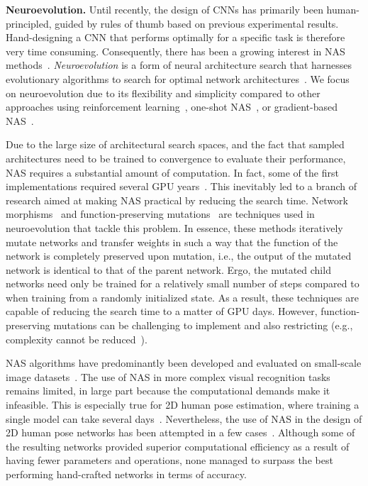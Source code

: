 \documentclass[final]{cvpr}
\begin{document}
\medskip\noindent\textbf{Neuroevolution.} Until recently, the design of CNNs has primarily been human-principled, guided by rules of thumb based on previous experimental results. Hand-designing a CNN that performs optimally for a specific task is therefore very time consuming. Consequently, there has been a growing interest in NAS methods~\cite{zoph2017neural}. \textit{Neuroevolution} is a form of neural architecture search that harnesses evolutionary algorithms to search for optimal network architectures~\cite{real2017large}. We focus on neuroevolution due to its flexibility and simplicity compared to other approaches using reinforcement learning~\cite{zoph2017neural, baker2016designing, zoph2018learning, tan2019mnasnet, tan2019efficientnet}, one-shot NAS~\cite{bender2018understanding, brock2017smash, pham2018efficient}, or gradient-based NAS~\cite{liu2018darts, yang2019pose}. 

Due to the large size of architectural search spaces, and the fact that sampled architectures need to be trained to convergence to evaluate their performance, NAS requires a substantial amount of computation. In fact, some of the first implementations required several GPU years~\cite{zoph2017neural, zoph2018learning, real2017large}. This inevitably led to a branch of research aimed at making NAS practical by reducing the search time. Network morphisms~\cite{wei2016network} and function-preserving mutations~\cite{wistuba2018deep} are techniques used in neuroevolution that tackle this problem. In essence, these methods iteratively mutate networks and transfer weights in such a way that the function of the network is completely preserved upon mutation, i.e., the output of the mutated network is identical to that of the parent network. Ergo, the mutated child networks need only be trained for a relatively small number of steps compared to when training from a randomly initialized state. As a result, these techniques are capable of reducing the search time to a matter of GPU days. However, function-preserving mutations can be challenging to implement and also restricting (e.g., complexity cannot be reduced~\cite{wistuba2018deep}).

NAS algorithms have predominantly been developed and evaluated on small-scale image datasets~\cite{wistuba2019survey}. The use of NAS in more complex visual recognition tasks remains limited, in large part because the computational demands make it infeasible. This is especially true for 2D human pose estimation, where training a single model can take several days~\cite{chen2018cascaded}. Nevertheless, the use of NAS in the design of 2D human pose networks has been attempted in a few cases~\cite{yang2019pose, gong2020autopose, zhang2020cpnas}. Although some of the resulting networks provided superior computational efficiency as a result of having fewer parameters and operations, none managed to surpass the best performing hand-crafted networks in terms of accuracy. 
\end{document}
